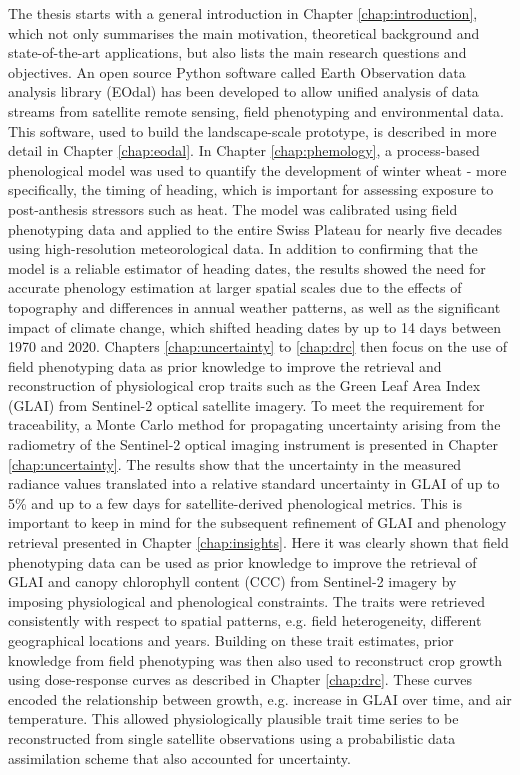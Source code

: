 The thesis starts with a general introduction in Chapter \ref{chap:introduction}, which not only summarises the main motivation, theoretical background and state-of-the-art applications, but also lists the main research questions and objectives.
An open source Python software called Earth Observation data analysis library (EOdal) has been developed to allow unified analysis of data streams from satellite remote sensing, field phenotyping and environmental data. This software, used to build the landscape-scale prototype, is described in more detail in Chapter \ref{chap:eodal}.
In Chapter \ref{chap:phemology}, a process-based phenological model was used to quantify the development of winter wheat - more specifically, the timing of heading, which is important for assessing exposure to post-anthesis stressors such as heat. The model was calibrated using field phenotyping data and applied to the entire Swiss Plateau for nearly five decades using high-resolution meteorological data. In addition to confirming that the model is a reliable estimator of heading dates, the results showed the need for accurate phenology estimation at larger spatial scales due to the effects of topography and differences in annual weather patterns, as well as the significant impact of climate change, which shifted heading dates by up to 14 days between 1970 and 2020.
Chapters \ref{chap:uncertainty} to \ref{chap:drc} then focus on the use of field phenotyping data as prior knowledge to improve the retrieval and reconstruction of physiological crop traits such as the Green Leaf Area Index (GLAI) from Sentinel-2 optical satellite imagery. To meet the requirement for traceability, a Monte Carlo method for propagating uncertainty arising from the radiometry of the Sentinel-2 optical imaging instrument is presented in Chapter \ref{chap:uncertainty}. The results show that the uncertainty in the measured radiance values translated into a relative standard uncertainty in GLAI of up to 5\% and up to a few days for satellite-derived phenological metrics. This is important to keep in mind for the subsequent refinement of GLAI and phenology retrieval presented in Chapter \ref{chap:insights}. Here it was clearly shown that field phenotyping data can be used as prior knowledge to improve the retrieval of GLAI and canopy chlorophyll content (CCC) from Sentinel-2 imagery by imposing physiological and phenological constraints. The traits were retrieved consistently with respect to spatial patterns, e.g. field heterogeneity, different geographical locations and years. Building on these trait estimates, prior knowledge from field phenotyping was then also used to reconstruct crop growth using dose-response curves as described in Chapter \ref{chap:drc}. These curves encoded the relationship between growth, e.g. increase in GLAI over time, and air temperature. This allowed physiologically plausible trait time series to be reconstructed from single satellite observations using a probabilistic data assimilation scheme that also accounted for uncertainty.
